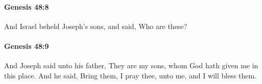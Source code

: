 		\paragraph{Genesis 48:8} %
			\label{GENESIS-48-8}

			And Israel beheld Joseph's sons, and said, Who are these?


		\paragraph{Genesis 48:9} %
			\label{GENESIS-48-9}

			And Joseph said unto his father, They are my sons, whom God hath given me in this place. And he said, Bring them, I pray thee, unto me, and I will bless them.


